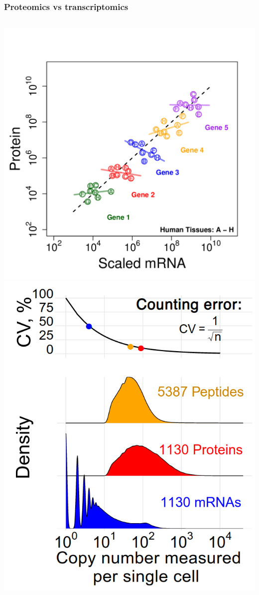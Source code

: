 \documentclass{beamer}
\begin{document}
\begin{frame}[b]
  \frametitle{Proteomics vs transcriptomics}
  
  \begin{columns}
    \includegraphics[width=\linewidth]{figs/simsons_paradox_in_gene_regulation.png}
    \centering
    \pause
    \includegraphics[width=\linewidth]{figs/Counting_error.png}
  

\end{columns}
\end{frame}
\end{document}
